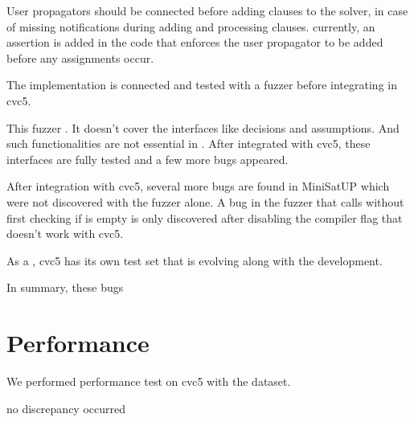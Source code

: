 User propagators should be connected before adding clauses to the solver, in case of missing notifications during adding and processing clauses.
currently, an assertion is added in the code that enforces the user propagator to be added before any assignments occur.

The implementation is connected and tested with a fuzzer before integrating in cvc5.

This fuzzer . It doesn't cover the interfaces like decisions and assumptions. And such functionalities are not essential in . After integrated with cvc5, these interfaces are fully tested and a few more bugs appeared.


After integration with cvc5, several more bugs are found in MiniSatUP which were not discovered with the fuzzer alone. A bug in the fuzzer that calls  without first checking if  is empty is only discovered after disabling the compiler flag  that doesn't work with cvc5.

As a , cvc5 has its own test set that is evolving along with the development.


In summary, these bugs 

\section{Performance}


We performed performance test on cvc5 with the dataset.


no discrepancy occurred
